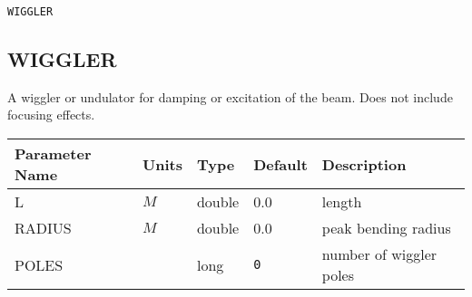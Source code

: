 \begin{latexonly}
\newpage
\begin{center}{\Large\verb|WIGGLER|}\end{center}
\end{latexonly}\subsection{WIGGLER}
A wiggler or undulator for damping or excitation of the beam.  Does not include focusing effects.
\\
\begin{tabular}{|l|l|l|l|p{\descwidth}|} \hline
Parameter Name & Units & Type & Default & Description \\ \hline 
L & $M$ & double &  0.0 & length  \\ \hline 
RADIUS & $M$ & double &  0.0 & peak bending radius  \\ \hline 
POLES &  & long &  \verb|0| & number of wiggler poles  \\ \hline 
\end{tabular}

